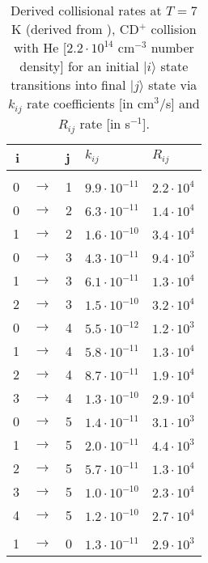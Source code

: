 \begin{longtable}[!htb]{rclll}
    \caption{Derived collisional rates at $T=7$ K (derived from \cite{Werfelli2017}), CD$^+$ collision with He [$2.2 \cdot 10^{14}$ cm$^{-3}$ number density] for an initial $|i\rangle$ state transitions into final $|j\rangle$ state via $k_{ij}$ rate coefficients [in cm$^3$/s] and $R_{ij}$ rate [in s$^{-1}$].}
    \label{appendix:tab:collisional-rate-coefficients}                  \\
    \hline
    i &               & j & $k_{ij}$             & $R_{ij}$             \\
    \hline\hline                                                        \\
    0 & $\rightarrow$ & 1 & $9.9 \cdot 10^{-11}$ & $2.2 \cdot 10^{4}$   \\
    0 & $\rightarrow$ & 2 & $6.3 \cdot 10^{-11}$ & $1.4 \cdot 10^{4}$   \\
    1 & $\rightarrow$ & 2 & $1.6 \cdot 10^{-10}$ & $3.4 \cdot 10^{4}$   \\
    0 & $\rightarrow$ & 3 & $4.3 \cdot 10^{-11}$ & $9.4 \cdot 10^{3}$   \\
    1 & $\rightarrow$ & 3 & $6.1 \cdot 10^{-11}$ & $1.3 \cdot 10^{4}$   \\
    2 & $\rightarrow$ & 3 & $1.5 \cdot 10^{-10}$ & $3.2 \cdot 10^{4}$   \\
    0 & $\rightarrow$ & 4 & $5.5 \cdot 10^{-12}$ & $1.2 \cdot 10^{3}$   \\
    1 & $\rightarrow$ & 4 & $5.8 \cdot 10^{-11}$ & $1.3 \cdot 10^{4}$   \\
    2 & $\rightarrow$ & 4 & $8.7 \cdot 10^{-11}$ & $1.9 \cdot 10^{4}$   \\
    3 & $\rightarrow$ & 4 & $1.3 \cdot 10^{-10}$ & $2.9 \cdot 10^{4}$   \\
    0 & $\rightarrow$ & 5 & $1.4 \cdot 10^{-11}$ & $3.1 \cdot 10^{3}$   \\
    1 & $\rightarrow$ & 5 & $2.0 \cdot 10^{-11}$ & $4.4 \cdot 10^{3}$   \\
    2 & $\rightarrow$ & 5 & $5.7 \cdot 10^{-11}$ & $1.3 \cdot 10^{4}$   \\
    3 & $\rightarrow$ & 5 & $1.0 \cdot 10^{-10}$ & $2.3 \cdot 10^{4}$   \\
    4 & $\rightarrow$ & 5 & $1.2 \cdot 10^{-10}$ & $2.7 \cdot 10^{4}$   \\
    \\
    1 & $\rightarrow$ & 0 & $1.3 \cdot 10^{-11}$ & $2.9 \cdot 10^{3}$   \\

\end{longtable}
